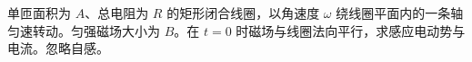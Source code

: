 单匝面积为 $A$、总电阻为 $R$ 的矩形闭合线圈，以角速度 $\omega$ 绕线圈平面内的一条轴匀速转动。匀强磁场大小为 $B$。在 $t=0$ 时磁场与线圈法向平行，求感应电动势与电流。忽略自感。
